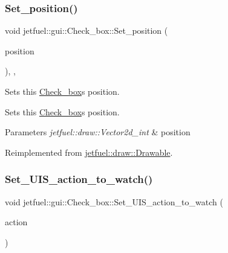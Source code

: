 \subsubsection{\texorpdfstring{Set\+\_\+position()}{Set\_position()}}
{\footnotesize\ttfamily void jetfuel\+::gui\+::\+Check\+\_\+box\+::\+Set\+\_\+position (\begin{DoxyParamCaption}\item[{const \hyperlink{classjetfuel_1_1draw_1_1Vector2d}{jetfuel\+::draw\+::\+Vector2d\+\_\+int}}]{position }\end{DoxyParamCaption})\hspace{0.3cm}{\ttfamily [inline]}, {\ttfamily [override]}, {\ttfamily [virtual]}}



Sets this \hyperlink{classjetfuel_1_1gui_1_1Check__box}{Check\+\_\+box}\textquotesingle{}s position. 

Sets this \hyperlink{classjetfuel_1_1gui_1_1Check__box}{Check\+\_\+box}\textquotesingle{}s position.


\begin{DoxyParams}{Parameters}
{\em jetfuel\+::draw\+::\+Vector2d\+\_\+int} & position \\
\hline
\end{DoxyParams}


Reimplemented from \hyperlink{classjetfuel_1_1draw_1_1Drawable_afdd035afe40c706459a6c9df813bcce6}{jetfuel\+::draw\+::\+Drawable}.

\mbox{\label{classjetfuel_1_1gui_1_1Check__box_a92a70756f7b7d37c3b40a08bc251ff8b}} 
\subsubsection{\texorpdfstring{Set\+\_\+\+U\+I\+S\+\_\+action\+\_\+to\+\_\+watch()}{Set\_UIS\_action\_to\_watch()}}
{\footnotesize\ttfamily void jetfuel\+::gui\+::\+Check\+\_\+box\+::\+Set\+\_\+\+U\+I\+S\+\_\+action\+\_\+to\+\_\+watch (\begin{DoxyParamCaption}\item[{const std\+::string}]{action }\end{DoxyParamCaption})\hspace{0.3cm}{\ttfamily [inline]}}



